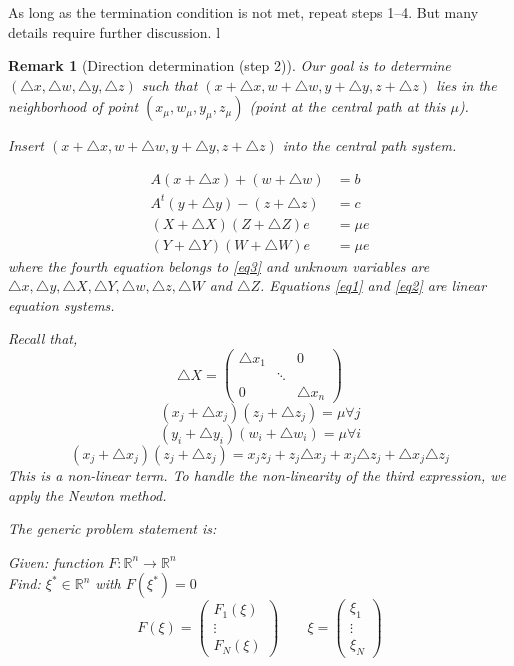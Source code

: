 \documentclass[a4paper]{article}
\numberwithin{lecref}{subsection}
\newtheorem*{Remark}{Remark}
\begin{document}
As long as the termination condition is not met, repeat steps 1--4.
But many details require further discussion.
l
\begin{Remark}[Direction determination (step 2)]
	Our goal is to determine $(\triangle x, \triangle w, \triangle y, \triangle z)$ such that $(x + \triangle x, w + \triangle w, y + \triangle y, z + \triangle z)$ lies in the neighborhood of point $(x_\mu, w_\mu, y_\mu, z_\mu)$ (point at the central path at this $\mu$).

	Insert $(x + \triangle x, w + \triangle w, y + \triangle y, z + \triangle z)$ into the central path system.

	\begin{align}
		A(x + \triangle x) + (w + \triangle w) &= b \label{eq1}\\
		A^t(y + \triangle y) - (z + \triangle z) &= c \label{eq2}\\
		(X + \triangle X)(Z + \triangle Z) e &= \mu e \label{eq3}\\
		(Y + \triangle Y)(W + \triangle W) e &= \mu e \nonumber
	\end{align}
	where the fourth equation belongs to \ref{eq3} and unknown variables are $\triangle x, \triangle y, \triangle X, \triangle Y, \triangle w, \triangle z, \triangle W$ and $\triangle Z$.
	Equations \ref{eq1} and \ref{eq2} are linear equation systems.

	Recall that,
	\[
		\triangle X = \begin{pmatrix}
			\triangle x_1 & & 0 \\
			& \ddots & \\
			0 & & \triangle x_n
		\end{pmatrix}
	\]
	\[ (x_j + \triangle x_j) (z_j + \triangle z_j) = \mu \forall j \]
	\[ (y_i + \triangle y_i) (w_i + \triangle w_i) = \mu \forall i \]
	\[ (x_j + \triangle x_j) (z_j + \triangle z_j) = x_j z_j + z_j \triangle x_j + x_j \triangle z_j + \triangle x_j \triangle z_j \]
	This is a non-linear term. To handle the non-linearity of the third expression, we apply the Newton method.

	The generic problem statement is:

	\emph{Given:} function $F: \mathbb R^n \to \mathbb R^n$ \\
	\emph{Find:} $\xi^* \in \mathbb R^n$ with $F(\xi^*) = 0$
	\[ F(\xi) = \begin{pmatrix} F_1(\xi) \\ \vdots \\ F_N(\xi) \end{pmatrix} \qquad \xi = \begin{pmatrix} \xi_1 \\ \vdots \\ \xi_N \end{pmatrix} \]


\end{Remark}
\end{document}
